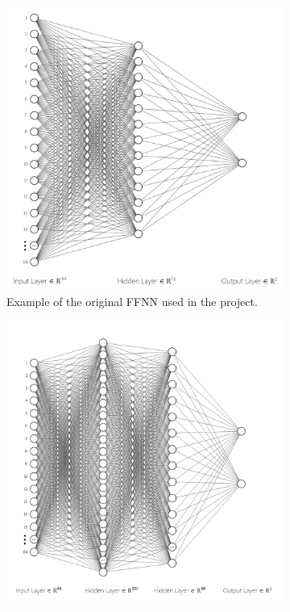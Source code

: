 \documentclass[11pt, a4paper]{article}
\begin{document}
\begin{figure}[H]
	\centering
	\begin{subfigure}[t]{0.45\linewidth}
		\includegraphics[width = \linewidth] {[ Figures ]/FFNN Original.png}
		\captionsetup{font = small, labelfont = small, width=.8\linewidth}
		\caption{Example of the original FFNN used in the project.}
		\label{fig:ffnn_:_original_motor_imagery}
	\end{subfigure}
	\begin{subfigure}[t]{0.45\linewidth}
		\includegraphics[width = \linewidth] {[ Figures ]/FFNN Second Attempt.png}

\end{subfigure}
\end{figure}
\end{document}
